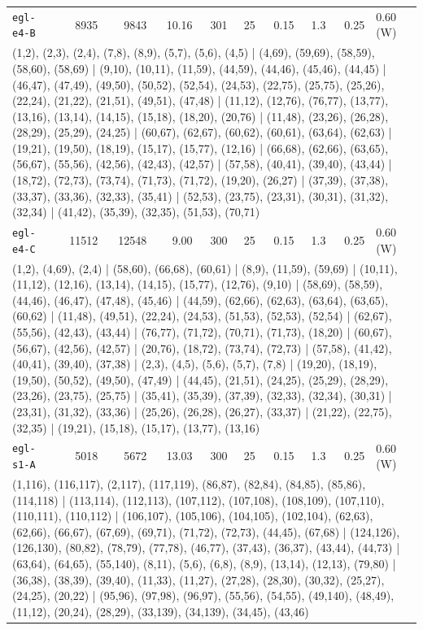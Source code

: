 \begin{longtable}{lrrrrrrrrl}
\texttt{egl-e4-B} & 8935 & 9843 & 10.16 & 301 & 25 & 0.15 & 1.3 & 0.25 & 0.60\,(W) \\
\multicolumn{10}{p{0.96\linewidth}}{\tiny\raggedright\arraybackslash (1,2), (2,3), (2,4), (7,8), (8,9), (5,7), (5,6), (4,5) | (4,69), (59,69), (58,59), (58,60), (58,69) | (9,10), (10,11), (11,59), (44,59), (44,46), (45,46), (44,45) | (46,47), (47,49), (49,50), (50,52), (52,54), (24,53), (22,75), (25,75), (25,26), (22,24), (21,22), (21,51), (49,51), (47,48) | (11,12), (12,76), (76,77), (13,77), (13,16), (13,14), (14,15), (15,18), (18,20), (20,76) | (11,48), (23,26), (26,28), (28,29), (25,29), (24,25) | (60,67), (62,67), (60,62), (60,61), (63,64), (62,63) | (19,21), (19,50), (18,19), (15,17), (15,77), (12,16) | (66,68), (62,66), (63,65), (56,67), (55,56), (42,56), (42,43), (42,57) | (57,58), (40,41), (39,40), (43,44) | (18,72), (72,73), (73,74), (71,73), (71,72), (19,20), (26,27) | (37,39), (37,38), (33,37), (33,36), (32,33), (35,41) | (52,53), (23,75), (23,31), (30,31), (31,32), (32,34) | (41,42), (35,39), (32,35), (51,53), (70,71)} \\[2pt]
\texttt{egl-e4-C} & 11512 & 12548 & 9.00 & 300 & 25 & 0.15 & 1.3 & 0.25 & 0.60\,(W) \\
\multicolumn{10}{p{0.96\linewidth}}{\tiny\raggedright\arraybackslash (1,2), (4,69), (2,4) | (58,60), (66,68), (60,61) | (8,9), (11,59), (59,69) | (10,11), (11,12), (12,16), (13,14), (14,15), (15,77), (12,76), (9,10) | (58,69), (58,59), (44,46), (46,47), (47,48), (45,46) | (44,59), (62,66), (62,63), (63,64), (63,65), (60,62) | (11,48), (49,51), (22,24), (24,53), (51,53), (52,53), (52,54) | (62,67), (55,56), (42,43), (43,44) | (76,77), (71,72), (70,71), (71,73), (18,20) | (60,67), (56,67), (42,56), (42,57) | (20,76), (18,72), (73,74), (72,73) | (57,58), (41,42), (40,41), (39,40), (37,38) | (2,3), (4,5), (5,6), (5,7), (7,8) | (19,20), (18,19), (19,50), (50,52), (49,50), (47,49) | (44,45), (21,51), (24,25), (25,29), (28,29), (23,26), (23,75), (25,75) | (35,41), (35,39), (37,39), (32,33), (32,34), (30,31) | (23,31), (31,32), (33,36) | (25,26), (26,28), (26,27), (33,37) | (21,22), (22,75), (32,35) | (19,21), (15,18), (15,17), (13,77), (13,16)} \\[2pt]
\texttt{egl-s1-A} & 5018 & 5672 & 13.03 & 300 & 25 & 0.15 & 1.3 & 0.25 & 0.60\,(W) \\
\multicolumn{10}{p{0.96\linewidth}}{\tiny\raggedright\arraybackslash (1,116), (116,117), (2,117), (117,119), (86,87), (82,84), (84,85), (85,86), (114,118) | (113,114), (112,113), (107,112), (107,108), (108,109), (107,110), (110,111), (110,112) | (106,107), (105,106), (104,105), (102,104), (62,63), (62,66), (66,67), (67,69), (69,71), (71,72), (72,73), (44,45), (67,68) | (124,126), (126,130), (80,82), (78,79), (77,78), (46,77), (37,43), (36,37), (43,44), (44,73) | (63,64), (64,65), (55,140), (8,11), (5,6), (6,8), (8,9), (13,14), (12,13), (79,80) | (36,38), (38,39), (39,40), (11,33), (11,27), (27,28), (28,30), (30,32), (25,27), (24,25), (20,22) | (95,96), (97,98), (96,97), (55,56), (54,55), (49,140), (48,49), (11,12), (20,24), (28,29), (33,139), (34,139), (34,45), (43,46)} \\[2pt]

\end{longtable}
